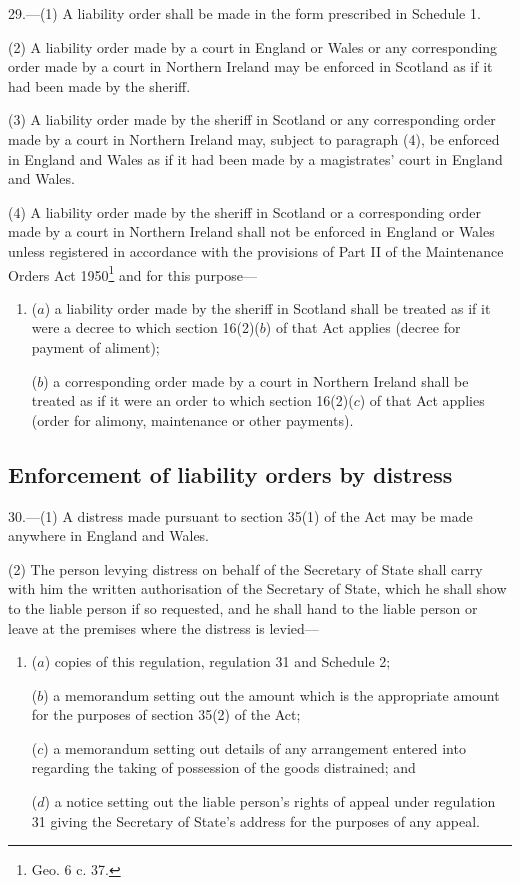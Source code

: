 \documentclass[12pt,a4paper]{article}
\begin{document}
29.—(1) A liability order shall be made in the form prescribed in Schedule 1.

(2) A liability order made by a court in England or Wales or any corresponding order made by a court in Northern Ireland may be enforced in Scotland as if it had been made by the sheriff.

(3) A liability order made by the sheriff in Scotland or any corresponding order made by a court in Northern Ireland may, subject to paragraph (4), be enforced in England and Wales as if it had been made by a magistrates' court in England and Wales.

(4) A liability order made by the sheriff in Scotland or a corresponding order made by a court in Northern Ireland shall not be enforced in England or Wales unless registered in accordance with the provisions of 
Part II %
of the Maintenance Orders Act 1950\footnote{ Geo. 6 c. 37.} and for this purpose—
\begin{enumerate}\item[]
($a$) a liability order made by the sheriff in Scotland shall be treated as if it were a decree to which section 16(2)($b$) of that Act applies (decree for payment of aliment);

($b$) a corresponding order made by a court in Northern Ireland shall be treated as if it were an order to which section 16(2)($c$) of that Act applies (order for alimony, maintenance or other payments).
\end{enumerate}


\subsection[30. Enforcement of liability orders by distress]{Enforcement of liability orders by distress}

30.—(1) A distress made pursuant to section 35(1) of the Act may be made anywhere in England and Wales.

(2) The person levying distress on behalf of the Secretary of State shall carry with him the written authorisation of the Secretary of State, which he shall show to the liable person if so requested, and he shall hand to the liable person or leave at the premises where the distress is levied—
\begin{enumerate}\item[]
($a$) copies of this regulation, regulation 31 and Schedule 2;

($b$) a memorandum setting out the amount which is the appropriate amount for the purposes of section 35(2) of the Act;

($c$) a memorandum setting out details of any arrangement entered into regarding the taking of possession of the goods distrained; and

($d$) a notice setting out the liable person’s rights of appeal under regulation 31 giving the Secretary of State’s address for the purposes of any appeal.
\end{enumerate}
\end{document}

